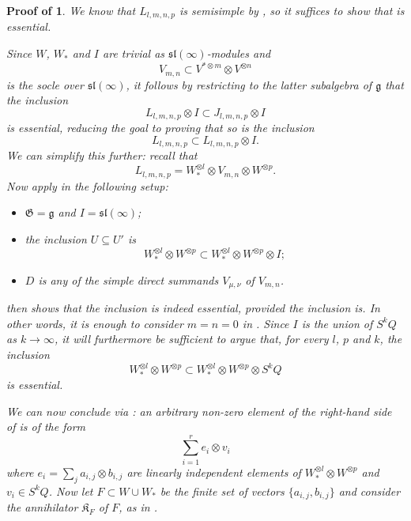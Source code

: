 \documentclass[11pt]{article}
\theoremstyle{plain}
\theoremstyle{nonumberplain}
\theoremstyle{plain}
\numberwithin{equation}{section}
\theoremstyle{nonumberplain}
\newcommand\pf[1]{\newtheorem{#1}{Proof of \Cref{#1}}}
\newcommand\fG{{\mathfrak G}}
\newcommand\fK{{\mathfrak K}}
\newcommand\fg{{\mathfrak g}}
\newcommand\fsl{\mathfrak{sl}}
\newcommand\1{{\bf 1}}
\begin{document}
\pf{pr.soc}
\begin{pr.soc}
  We know that $L_{l,m,n,p}$ is semisimple by \cite[Corollary 4.3]{us0}, so it suffices to show that  is essential. 

  Since $W$, $W_*$ and $I$ are trivial as $\fsl(\infty)$-modules and
  \begin{equation*}
    V_{m,n}\subset V^{*\otimes m}\otimes V^{\otimes n}
  \end{equation*}
  is the socle over $\fsl(\infty)$, it follows by restricting to the latter subalgebra of $\fg$ that the inclusion
  \begin{equation*}
    L_{l,m,n,p}\otimes I\subset J_{l,m,n,p}\otimes I
  \end{equation*}
  is essential, reducing the goal to proving that so is the inclusion
  \begin{equation}\label{eq:6}
    L_{l,m,n,p}\subset L_{l,m,n,p}\otimes I. 
  \end{equation}
  We can simplify this further: recall that
  \begin{equation*}
    L_{l,m,n,p}=W_*^{\otimes l}\otimes V_{m,n}\otimes W^{\otimes p}.
  \end{equation*}
  Now apply  in the following setup:
  \begin{itemize}
  \item[$-$] $\fG=\fg$ and $I=\fsl(\infty)$;
  \item[$-$] the inclusion $U\subseteq U'$ is
    \begin{equation}\label{eq:7}
      W_*^{\otimes l}\otimes W^{\otimes p}\subset W_*^{\otimes l}\otimes W^{\otimes p}\otimes I;
    \end{equation}
  \item[$-$] $D$ is any of the simple direct summands $V_{\mu,\nu}$ of $V_{m,n}$.    
  \end{itemize}
   then shows that the inclusion  is indeed %
  essential, provided the inclusion  is. In other words, it is enough to consider $m=n=0$ in . Since $I$ is the union of $S^kQ$ as $k\to \infty$, it will furthermore be sufficient to argue that, for every $l$, $p$ and $k$, the inclusion
  \begin{equation}\label{eq:9}
    W_*^{\otimes l}\otimes W^{\otimes p}\subset W_*^{\otimes l}\otimes W^{\otimes p}\otimes S^kQ
  \end{equation}
  is essential.

  We can now conclude via : an arbitrary non-zero element of the right-hand side of  is of the form
  \begin{equation*}
    \sum_{i=1}^r e_i\otimes v_i
  \end{equation*}
  where $e_i=\sum_{j} a_{i,j} \otimes b_{i,j}$ are linearly independent elements of $W_*^{\otimes l}\otimes W^{\otimes p}$ and $v_i\in S^kQ$. Now let $F\subset W\cup W_*$ be the finite set of vectors $\{a_{i,j}, b_{i,j}\}$ and consider the annihilator $\fK_F$ of $F$, as in .


\end{pr.soc}
\end{document}

